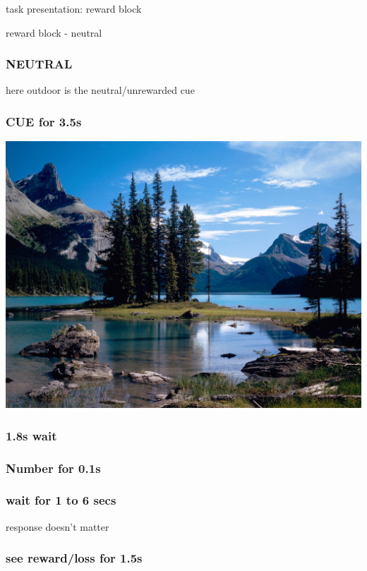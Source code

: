 \documentclass{beamer}
\begin{document}
\begin{section}{task presentation: reward block}
\begin{subsection}{reward block - neutral}
\begin{frame} \frametitle{NEUTRAL} here outdoor is the neutral/unrewarded cue \end{frame}
\begin{frame} \frametitle{CUE for 3.5s}
   \begin{center}
	\includegraphics[width=.5\textwidth]{../imgs/Scenes/Outdoors/the-great-outdoors.jpg} \\
   \end{center}
\end{frame}

\begin{frame} \frametitle{1.8s wait} \end{frame}
\begin{frame} \frametitle{Number for 0.1s}  \end{frame}
\begin{frame} \frametitle{wait for 1 to 6 secs} \tiny{response doesn't matter}\end{frame}
\begin{frame} 
 \frametitle{see reward/loss for 1.5s}
   \begin{center}
   \end{center}
\end{frame}

\end{subsection}
\end{section}
\end{document}
